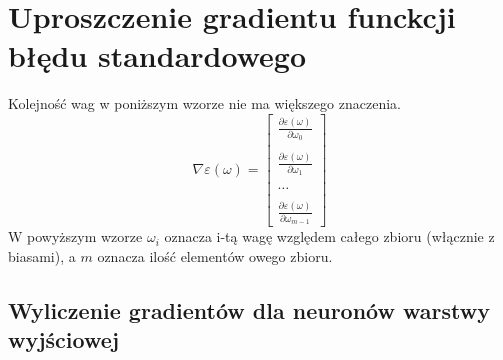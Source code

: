 \documentclass[]{article}
\begin{document}
\newpage
\section{Uproszczenie gradientu funckcji błędu standardowego}
	Kolejność wag w poniższym wzorze nie ma większego znaczenia.
	\begin{equation}
		\nabla \varepsilon\left( \omega \right) =
		\begin{bmatrix}
			\frac{ \partial \varepsilon\left( \omega \right) }{ \partial \omega_{0} } \\ \\
			\frac{ \partial \varepsilon\left( \omega \right) }{ \partial \omega_{1} } \\ \\
			\dots \\ \\
			\frac{ \partial \varepsilon\left( \omega \right) }{ \partial \omega_{m-1} }
		\end{bmatrix}
	\end{equation}
	W powyższym wzorze $ \omega_{i} $ oznacza i-tą wagę względem całego zbioru (włącznie z biasami), a $m$ oznacza ilość elementów owego zbioru.
	
	\subsection{Wyliczenie gradientów dla neuronów warstwy wyjściowej} \label{chapter:gradientcalculation}
\end{document}
